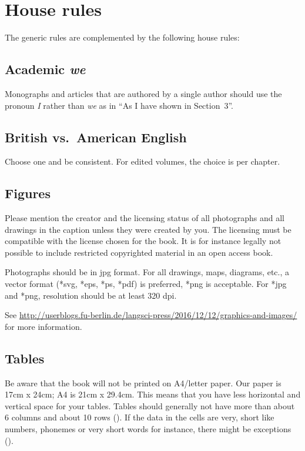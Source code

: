 \section{House rules}\label{sec:houserules}
The generic rules are complemented by the following house rules:

\subsection{Academic \emph{we}}

Monographs and articles that are authored by a single author should use the pronoun \emph{I} rather
than \emph{we} as in ``As I have shown in Section~3''.	
 

\subsection{British vs.\ American English}
Choose one and be consistent. For edited volumes, the choice is per chapter.  


\subsection{Figures}  
Please mention the creator and the licensing status of all photographs and all drawings in the caption unless they were created by you. The licensing must be compatible with the license chosen for the book. It is for instance legally not possible to include restricted copyrighted material in an open access book. 

Photographs should be in jpg format. For all drawings, maps, diagrams, etc., a vector format (*svg, *eps, *ps, *pdf) is preferred, *png is acceptable. For *jpg and *png, resolution should be at least 320 dpi. 

See \url{http://userblogs.fu-berlin.de/langsci-press/2016/12/12/graphics-and-images/} for more information.

\subsection{Tables}
Be aware that the book will not be printed on A4/letter paper. Our paper is 17cm x 24cm; A4 is 21cm x 29.4cm.  This means that you have less horizontal and vertical space for your tables. Tables should generally not have more than about 6 columns and about 10 rows (). If the data in the cells are very, short like numbers, phonemes or very short words for instance, there might be exceptions ().



